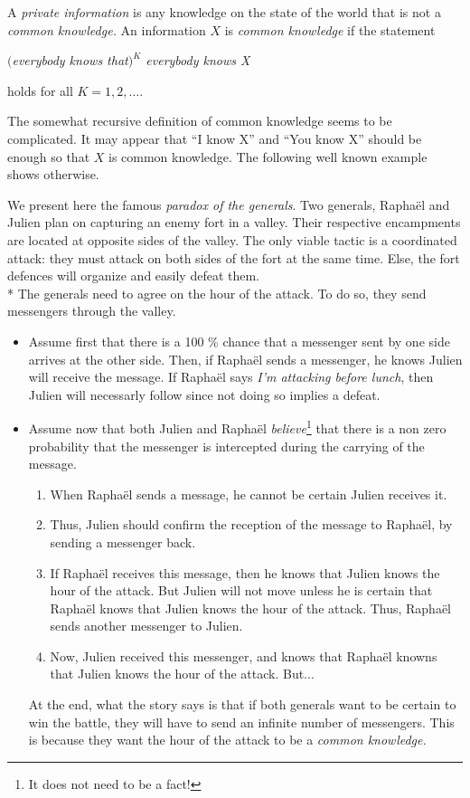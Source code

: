 \begin{definition}
A \emph{private information} is any knowledge on the state of the world that is not a \emph{common knowledge.} An information $X$ is \emph{common knowledge} if the statement
\begin{center}
\emph{$($everybody knows that$)^K$ everybody knows X}
\end{center}
holds for all $K = 1, 2, \ldots$.
\end{definition}

 The somewhat recursive definition of common knowledge seems to be complicated.
 It may appear that ``I know X'' and ``You know X'' should be enough so that $X$ is common knowledge. The following well known example shows otherwise.

 \begin{example}
 We present here the famous \emph{paradox of the generals}.
 Two generals, Rapha\"el and Julien plan on capturing an enemy fort in a valley.
 Their respective encampments are located at opposite sides of the valley.
 The only viable tactic is a coordinated attack: they must attack on both sides of the fort at the same time. Else, the fort defences will organize and easily defeat them. \\*
 The generals need to agree on the hour of the attack. To do so, they send messengers through the valley.
\begin{itemize}
\item Assume first that there is a 100 \% chance that a messenger sent by one side arrives at the other side. Then, if Rapha\"el sends a messenger, he knows Julien will receive the message. If Rapha\"el says \emph{I'm attacking before lunch}, then Julien will necessarly follow since not doing so implies a defeat.
\item Assume now that both Julien and Rapha\"el \emph{believe}\footnote{It does not need to be a fact!} that there is a non zero probability that the messenger is intercepted during the carrying of the message.
\begin{enumerate}
\item When Rapha\"el sends a message, he cannot be certain Julien receives it. \item Thus, Julien should confirm the reception of the message to Rapha\"el, by sending a messenger back.
\item If Rapha\"el receives this message, then he knows that Julien knows the hour of the attack. But Julien will not move unless he is certain that Rapha\"el knows that Julien knows the hour of the attack. Thus, Rapha\"el sends another messenger to Julien.
\item Now, Julien received this messenger, and knows that Rapha\"el knowns that Julien knows the hour of the attack. But...
\end{enumerate}
At the end, what the story says is that if both generals want to be certain to win the battle, they will have to send an infinite number of messengers.
This is because they want the hour of the attack to be a \emph{common knowledge.}
\end{itemize}
\end{example}

